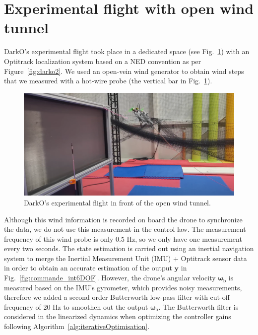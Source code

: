\section{Experimental flight with open wind tunnel} 
\label{sec:exp6DOF}
DarkO's experimental flight took place in a dedicated space (see Fig.~\ref{fig:flight_windshape}) with an Optitrack localization system based on a NED convention as per Figure~\ref{fig:darko2}. We used an open-vein wind generator to obtain wind steps that we measured with a hot-wire probe (the vertical bar in Fig.~\ref{fig:flight_windshape}). 
\begin{figure}[ht!]
    \centering
    \includegraphics[trim=0cm 0cm 0cm 0cm,clip,width=1\columnwidth]{figures/img_flight_darko.png}
    \caption{DarkO's experimental flight in front of the open wind tunnel.}
    \label{fig:flight_windshape}
\end{figure}
Although this wind information is recorded on board the drone to synchronize the data, we do not use this measurement in the control law. The measurement frequency of this wind probe is only 0.5 Hz, so we only have one measurement every two seconds. 
The state estimation is carried out using an inertial navigation system to merge the Inertial Measurement Unit (IMU) + Optitrack sensor data in order to obtain an accurate estimation of the output $\boldsymbol{y}$ in Fig.~\ref{fig:commande_int6DOF}. However, the drone's angular velocity $\boldsymbol{\omega}_{\text{b}}$ is measured based on the IMU's gyrometer, which provides noisy measurements, therefore we added a second order Butterworth low-pass filter with cut-off frequency of 20 Hz to smoothen out the output $\boldsymbol{\omega}_{\text{b}}$. The Butterworth filter is considered in the linearized dynamics when optimizing the controller gains following Algorithm~\ref{alg:iterativeOptimisation}. 
